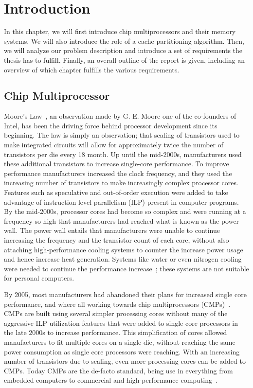 \chapter{Introduction}
\label{cpt:introduction}

In this chapter, we will first introduce chip multiprocessors and their memory systems.
We will also introduce the role of a cache partitioning algorithm.
Then, we will analyze our problem description and introduce a set of requirements the thesis has to fulfill.
Finally, an overall outline of the report is given, including an overview of which chapter fulfills the various requirements.

\section{Chip Multiprocessor}

Moore's Law~\cite{Moore1998}, an observation made by G. E. Moore one of the co-founders of Intel, has been the driving force behind processor development since its beginning.
The law is simply an observation; that scaling of transistors used to make integrated circuits will allow for approximately twice the number of transistors per die every 18 month.
Up until the mid-2000s, manufacturers used these additional transistors to increase single-core performance.
To improve performance manufacturers increased the clock frequency, and they used the increasing number of transistors to make increasingly complex processor cores.
Features such as speculative and out-of-order execution were added to take advantage of instruction-level parallelism (ILP) present in computer programs.
By the mid-2000s, processor cores had become so complex and were running at a frequency so high that manufacturers had reached what is known as the power wall.
The power wall entails that manufacturers were unable to continue increasing the frequency and the transistor count of each core, without also attaching high-performance cooling systems to counter the increase power usage and hence increase heat generation.
Systems like water or even nitrogen cooling were needed to continue the performance increase~\cite{Sutter2005}; these systems are not suitable for personal computers.

By 2005, most manufacturers had abandoned their plans for increased single core performance, and where all working towards chip multiprocessors (CMPs)~\cite{Sutter2005}.
CMPs are built using several simpler processing cores without many of the aggressive ILP utilization features that were added to single core processors in the late 2000s to increase performance.
This simplification of cores allowed manufacturers to fit multiple cores on a single die, without reaching the same power consumption as single core processors were reaching.
With an increasing number of transistors due to scaling, even more processing cores can be added to CMPs.
Today CMPs are the de-facto standard, being use in everything from embedded computers to commercial and high-performance computing~\cite{Thomadakis2011, Jain2013}.


